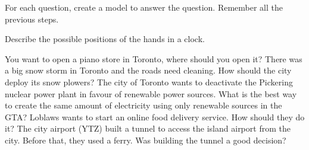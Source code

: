 \begin{exercises}
	For each question, create a model to answer the question. Remember all the previous steps.
	
	\begin{problist}
	
		\prob Describe the possible positions of the hands in a clock.

		\prob You want to open a piano store in Toronto, where should you open it? 
		\prob There was a big snow storm in Toronto and the roads need cleaning. How should the city deploy its snow plowers?
		\prob The city of Toronto wants to deactivate the Pickering nuclear power plant in favour of renewable power sources. What is the best way to create the same amount of electricity using only renewable sources in the GTA?
		\prob Loblaws wants to start an online food delivery service. How should they do it?
		\prob The city airport (YTZ) built a tunnel to access the island airport from the city. Before that, they used a ferry. Was building the tunnel a good decision?	
		
		\label{exercises:models}
	\end{problist}
\end{exercises}
